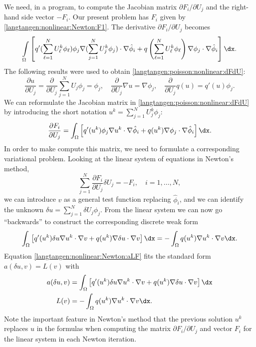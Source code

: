 We need, in a program, to compute the Jacobian matrix $\partial
F_i/\partial U_j$ and the right-hand side vector $-F_i$.  Our present
problem has $F_i$ given by \eqref{langtangen:nonlinear:Newton:F1}.
The derivative $\partial F_i/\partial U_j$ becomes
\begin{equation}
\int\limits_\Omega \left\lbrack
 q'(\sum_{\ell=1}^NU_\ell^k\phi_\ell)\phi_j
\nabla (\sum_{j=1}^NU_j^k\phi_j)\cdot \nabla \hat\phi_i
+
q\left(\sum_{\ell=1}^NU_\ell^k\phi_\ell\right)
\nabla \phi_j \cdot \nabla \hat\phi_i
\right\rbrack
\dx.
\label{langtangen:poisson:nonlinear:dFdU}
\end{equation}
The following results were used to obtain \eqref{langtangen:poisson:nonlinear:dFdU}:
\begin{equation}
\frac{\partial u}{\partial U_j} = \frac{\partial}{\partial U_j}
\sum_{j=1}^NU_j\phi_j = \phi_j,\quad \frac{\partial}{\partial U_j}\nabla u
      = \nabla\phi_j,\quad \frac{\partial}{\partial U_j}q(u) = q'(u)\phi_j.
\end{equation}
We can reformulate the Jacobian matrix
in \eqref{langtangen:poisson:nonlinear:dFdU} by introducing the short
notation $u^k = \sum_{j=1}^NU_j^k\phi_j$:
\begin{equation}
\frac{\partial F_i}{\partial U_j} =
\int_\Omega \left\lbrack
q'(u^k)\phi_j
\nabla u^k \cdot \nabla \hat\phi_i
+
q(u^k)
\nabla \phi_j \cdot \nabla \hat\phi_i
\right\rbrack
\dx.
\end{equation}
In order to make \fenics{} compute this matrix, we need to formulate a
corresponding variational problem. Looking at the
linear system of equations in Newton's method,
\[ \sum_{j=1}^N \frac{\partial F_i}{\partial U_j}\delta U_j = -F_i,\quad
i=1,\ldots,N,\]
we can introduce $v$ as a general test function replacing $\hat\phi_i$,
and we can identify the unknown
$\delta u = \sum_{j=1}^N\delta U_j\phi_j$. From the linear system
we can now go ``backwards'' to construct the corresponding
discrete weak form
\begin{equation}
\label{langtangen:nonlinear:Newton:aLF}
\int_\Omega \left\lbrack
q'(u^k)\delta u
\nabla u^k \cdot \nabla v
+
q(u^k)
\nabla \delta u\cdot \nabla v
\right\rbrack
\dx = - \int_\Omega q(u^k)
\nabla u^k\cdot \nabla v \dx.
\end{equation}
Equation \eqref{langtangen:nonlinear:Newton:aLF} fits the standard form
$a(\delta u,v)=L(v)$ with
\begin{align}
a(\delta u,v) &= \int_\Omega \left\lbrack q'(u^k)\delta u \nabla u^k \cdot \nabla v
  + q(u^k) \nabla \delta u \cdot \nabla v \right\rbrack \dx
\\
L(v) &= - \int_\Omega q(u^k) \nabla u^k\cdot \nabla v \dx.
\end{align}
Note the important feature in Newton's method that the previous solution
$u^k$ replaces $u$ in the formulas when computing the matrix $\partial
F_i/\partial U_j$ and vector $F_i$ for the linear system in each Newton
iteration.

